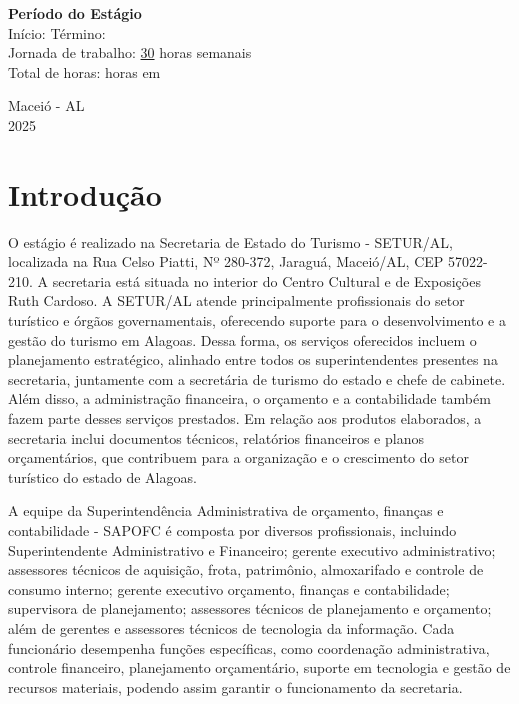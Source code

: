 \documentclass[12pt,a4paper]{article}
\begin{document}
	\vspace{0.5cm}
	\noindent \textbf{Período do Estágio} \\
	Início: \underline{\hspace{0,2cm}} \quad Término:\underline{\hspace{0,2cm}} \\
	Jornada de trabalho: \underline{30\hspace{0,2cm}} horas semanais \\
	Total de horas: \underline{\hspace{0,2cm}} horas em \underline{\hspace{0,2cm}} \\
	
	\vfill
	\begin{flushright}
		\centering Maceió - AL \\
		2025
	\end{flushright}
	
	\newpage
	
	\section{Introdução}
	
	\hspace*{1,5cm}  O estágio é realizado na Secretaria de Estado do Turismo - SETUR/AL, localizada na Rua Celso Piatti, Nº 280-372, Jaraguá, Maceió/AL, CEP 57022-210. A secretaria está situada no interior do Centro Cultural e de Exposições Ruth Cardoso. A SETUR/AL atende principalmente profissionais do setor turístico e órgãos governamentais, oferecendo suporte para o desenvolvimento e a gestão do turismo em Alagoas. Dessa forma, os serviços oferecidos incluem o planejamento estratégico, alinhado entre todos os superintendentes presentes na secretaria, juntamente com a secretária de turismo do estado e chefe de cabinete. Além disso, a administração financeira, o orçamento e a contabilidade também fazem parte desses serviços prestados. Em relação aos produtos elaborados, a secretaria inclui documentos técnicos, relatórios financeiros e planos orçamentários, que contribuem para a organização e o crescimento do setor turístico do estado de Alagoas.
	
	A equipe da Superintendência Administrativa de orçamento, finanças e contabilidade - SAPOFC é composta por diversos profissionais, incluindo Superintendente Administrativo e Financeiro; gerente executivo administrativo; assessores técnicos de aquisição, frota, patrimônio, almoxarifado e controle de consumo interno; gerente executivo orçamento, finanças e contabilidade; supervisora de planejamento; assessores técnicos de planejamento e orçamento; além de gerentes e assessores técnicos de tecnologia da informação. Cada funcionário desempenha funções específicas, como coordenação administrativa, controle financeiro, planejamento orçamentário, suporte em tecnologia e gestão de recursos materiais, podendo assim garantir o funcionamento da secretaria.
\end{document}
